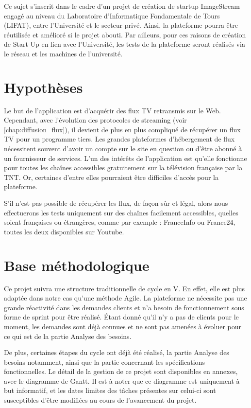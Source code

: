 \documentclass{polytech/polytech}
\begin{document}
Ce sujet s’inscrit dans le cadre d’un projet de création de startup ImageStream engagé au niveau du Laboratoire d’Informatique Fondamentale de Tours (LIFAT), entre l’Université et le secteur privé. Ainsi, la plateforme pourra être réutilisée et amélioré si le projet abouti. Par ailleurs, pour ces raisons de création de Start-Up en lien avec l’Université, les tests de la plateforme seront réalisés via le réseau et les machines de l’université.

\section{Hypothèses}

Le but de l’application est d’acquérir des flux TV retransmis sur le Web. Cependant, avec l’évolution des protocoles de streaming (voir \autoref{chap:diffusion_flux}), il devient de plus en plus compliqué de récupérer un flux TV pour un programme tiers. Les grandes plateformes d’hébergement de flux nécessitent souvent d’avoir un compte sur le site en question ou d’être abonné à un fournisseur de services. L’un des intérêts de l’application est qu’elle fonctionne pour toutes les chaînes accessibles gratuitement sur la télévision française par la TNT. Or, certaines d’entre elles pourraient être difficiles d’accès pour la plateforme.

S’il n’est pas possible de récupérer les flux, de façon sûr et légal, alors nous effectuerons les tests uniquement sur des chaînes facilement accessibles, quelles soient françaises ou étrangères, comme par exemple : FranceInfo ou France24, toutes les deux disponibles sur Youtube.


\section{Base méthodologique}

Ce projet suivra une structure traditionnelle de cycle en V. En effet, elle est plus adaptée dans notre cas qu’une méthode Agile. La plateforme ne nécessite pas une grande réactivité dans les demandes clients et n’a besoin de fonctionnement sous forme de sprint pour être réalisé. Étant donné qu’il n’y a pas de clients pour le moment, les demandes sont déjà connues et ne sont pas amenées à évoluer pour ce qui est de la partie Analyse des besoins.


De plus, certaines étapes du cycle ont déjà été réalisé, la partie Analyse des besoins notamment, ainsi que la partie concernant les spécifications fonctionnelles. Le détail de la gestion de ce projet sont disponibles en annexes, avec le diagramme de Gantt. Il est à noter que ce diagramme est uniquement à but informatif, et les dates limites des tâches présentes sur celui-ci sont susceptibles d’être modifiées au cours de l’avancement du projet.
\end{document}
